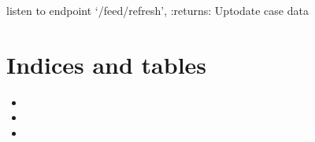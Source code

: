 \documentclass[letterpaper,10pt,english]{sphinxmanual}
\begin{document}
\begin{fulllineitems}
\label{\detokenize{Handler:Handler.refresh}}
listen to endpoint ‘/feed/refresh’,
:returns: Up\sphinxhyphen{}to\sphinxhyphen{}date case data

\end{fulllineitems}



\chapter{Indices and tables}
\label{\detokenize{index:indices-and-tables}}\begin{itemize}
\item {} 

\item {} 

\item {} 

\end{itemize}


\renewcommand{\indexname}{Python Module Index}
\begin{sphinxtheindex}
\let\bigletter\sphinxstyleindexlettergroup
\bigletter{h}
\item\relax{}
\end{sphinxtheindex}

\renewcommand{\indexname}{Index}
\printindex
\end{document}
